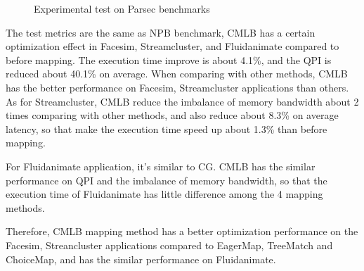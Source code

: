 \documentclass[a4paper,fleqn]{cas-sc}
\begin{document}
\begin{figure}[htbp]
{\begin{minipage}[t]{0.45\linewidth}
		\end{minipage}
	}%
	\centering
	\caption{Experimental test on Parsec benchmarks} \label{FIG:7}
\end{figure}

The test metrics are the same as NPB benchmark, CMLB has a certain optimization effect in Facesim, Streamcluster, and Fluidanimate compared to before mapping. The execution time improve is about 4.1\%, and the QPI is reduced about 40.1\% on average. When comparing with other methods, CMLB has the better performance on Facesim, Streamcluster applications than others. As for Streamcluster, CMLB reduce the imbalance of memory bandwidth about 2 times comparing with other methods, and also reduce about 8.3\% on average latency, so that make the execution time speed up about 1.3\% than before mapping.

For Fluidanimate application, it’s similar to CG. CMLB has the similar performance on QPI and the imbalance of memory bandwidth, so that the execution time of Fluidanimate has little difference among the 4 mapping methods.

Therefore, CMLB mapping method has a better optimization performance on the Facesim, Streancluster applications compared to EagerMap, TreeMatch and ChoiceMap, and has the similar performance on Fluidanimate.
\end{document}
